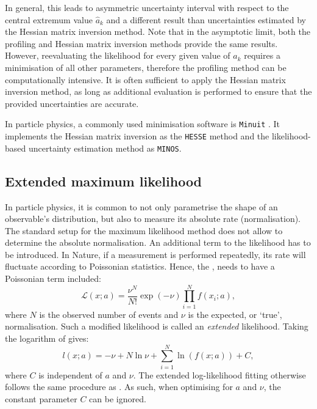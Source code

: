 In general, this leads to asymmetric uncertainty interval with respect to the central extremum value $\hat{a}_k$ and a different result than uncertainties estimated by the Hessian matrix inversion method.
Note that in the asymptotic limit, both the profiling and Hessian matrix inversion methods provide the same results.
However, reevaluating the likelihood for every given value of $a_k$ requires a minimisation of all other parameters, 
therefore the profiling method can be computationally intensive. 
It is often sufficient to apply the Hessian matrix inversion method, 
as long as additional evaluation is performed to ensure that the provided uncertainties are accurate.

In particle physics, a commonly used minimisation software is \texttt{Minuit} \cite{James:1975dr,James:2296388}.
It implements the Hessian matrix inversion as the \texttt{HESSE} method and the likelihood-based uncertainty estimation method as \texttt{MINOS}.
\subsection{Extended maximum likelihood}

In particle physics, it is common to not only parametrise the shape of an observable's distribution, but also to measure its absolute rate (normalisation).
The standard setup for the maximum likelihood method does not allow to determine the absolute normalisation. 
An additional term to the likelihood has to be introduced.
In Nature, if a measurement is performed repeatedly, its rate will fluctuate according to Poissonian statistics.
Hence, the , needs to have a Poissonian term included:
\begin{equation}\label{eq:extended_likelihood}
    \mathcal{L}(x;a) = \frac{\nu^N}{N!}\exp(-\nu)\prod_{i=1}^N f(x_i;a),
\end{equation}
where $N$ is the observed number of events and $\nu$ is the expected, or `true', normalisation. 
Such a modified likelihood is called an \textit{extended} likelihood.
Taking the logarithm of  gives:
\begin{equation}\label{eq:extended_log_likelihood}
    l(x;a) = -\nu + N\ln{\nu} + \sum_{i=1}^N \ln (f(x;a)) + C,
\end{equation}
where $C$ is independent of $a$ and $\nu$. 
The extended log-likelihood fitting otherwise follows the same procedure as .
As such, when optimising  for $a$ and $\nu$, the constant parameter $C$ can be ignored.

